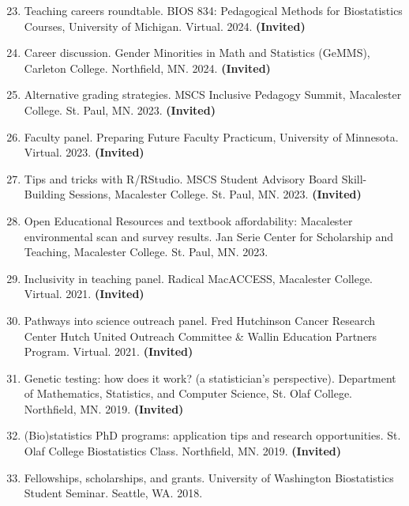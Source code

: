 \documentclass[margin]{res}
\newenvironment{benumerate}[1]{
    \let\oldItem\item
    \def\item{\addtocounter{enumi}{-2}\oldItem}
    
    \begin{enumerate}
    \setcounter{enumi}{#1}
    \addtocounter{enumi}{1}
}{
    \end{enumerate}
}
\begin{document}
\begin{resume}
\begin{benumerate}{22}
\item Teaching careers roundtable. BIOS 834: Pedagogical Methods for Biostatistics Courses, University of Michigan.  Virtual.  2024. \textbf{(Invited)}

\item Career discussion. Gender Minorities in Math and Statistics (GeMMS), Carleton College. Northfield, MN. 2024. \textbf{(Invited)}

\item Alternative grading strategies. MSCS Inclusive Pedagogy Summit, Macalester College. St. Paul, MN. 2023.  \textbf{(Invited)}

\item Faculty panel.  Preparing Future Faculty Practicum, University of Minnesota. Virtual. 2023. \textbf{(Invited)}

\item Tips and tricks with R/RStudio.  MSCS Student Advisory Board Skill-Building Sessions, Macalester College. St. Paul, MN. 2023. \textbf{(Invited)}

\item Open Educational Resources and textbook affordability: Macalester environmental scan and survey results.  Jan Serie Center for Scholarship and Teaching, Macalester College. St. Paul, MN. 2023.


\item Inclusivity in teaching panel. Radical MacACCESS, Macalester College. Virtual. 2021. \textbf{(Invited)}

\item Pathways into science outreach panel. Fred Hutchinson Cancer Research Center Hutch United Outreach Committee \& Wallin Education Partners Program. Virtual. 2021. \textbf{(Invited)}

\item Genetic testing: how does it work? (a statistician's perspective). Department of Mathematics, Statistics, and Computer Science, St. Olaf College. Northfield, MN. 2019. \textbf{(Invited)}

\item (Bio)statistics PhD programs: application tips and research opportunities. St. Olaf College Biostatistics Class. Northfield, MN. 2019. \textbf{(Invited)}

\item Fellowships, scholarships, and grants. University of Washington Biostatistics Student Seminar. Seattle, WA. 2018.


\end{benumerate}
\end{resume}
\end{document}
